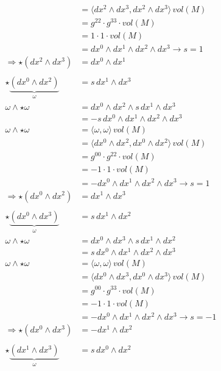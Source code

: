\begin{align*}
	\\
	&=
	\langle dx^2 \wedge dx^3, dx^2 \wedge dx^3 \rangle \, vol(M)
	\\
	&=
	g^{22} \cdot g^{33} \cdot vol(M)
	\\
	&=
	1 \cdot 1 \cdot vol(M)
	\\
	&=
	dx^0 \wedge dx^1 \wedge dx^2 \wedge dx^3 \rightarrow s = 1
	\\
	\Rightarrow \star(dx^2 \wedge dx^3)
	&=
	dx^0 \wedge dx^1
\\
\\
	\star \underbrace{(dx^0 \wedge dx^2)}_{\omega}
	&=
	s \, dx^1 \wedge dx^3
	\\
	\omega \wedge \star \omega
	&=
	dx^0 \wedge dx^2 \wedge s \, dx^1 \wedge dx^3
	\\
	&=
	-s \, dx^0 \wedge dx^1 \wedge dx^2 \wedge dx^3
	\\
	\omega \wedge \star \omega
	&=
	\langle \omega, \omega \rangle \, vol(M)
	\\
	&=
	\langle dx^0 \wedge dx^2, dx^0 \wedge dx^2 \rangle \, vol(M)
	\\
	&=
	g^{00} \cdot g^{22} \cdot vol(M)
	\\
	&=
	-1 \cdot 1 \cdot vol(M)
	\\
	&=
	-dx^0 \wedge dx^1 \wedge dx^2 \wedge dx^3 \rightarrow s = 1
	\\
	\Rightarrow \star(dx^0 \wedge dx^2)
	&=
	dx^1 \wedge dx^3
\\
\\
	\star \underbrace{(dx^0 \wedge dx^3)}_{\omega}
	&=
	s \, dx^1 \wedge dx^2
	\\
	\omega \wedge \star \omega
	&=
	dx^0 \wedge dx^3 \wedge s \, dx^1 \wedge dx^2
	\\
	&=
	s \, dx^0 \wedge dx^1 \wedge dx^2 \wedge dx^3
	\\
	\omega \wedge \star \omega
	&=
	\langle \omega, \omega \rangle \, vol(M)
	\\
	&=
	\langle dx^0 \wedge dx^3, dx^0 \wedge dx^3 \rangle \, vol(M)
	\\
	&=
	g^{00} \cdot g^{33} \cdot vol(M)
	\\
	&=
	-1 \cdot 1 \cdot vol(M)
	\\
	&=
	-dx^0 \wedge dx^1 \wedge dx^2 \wedge dx^3 \rightarrow s = -1
	\\
	\Rightarrow \star(dx^0 \wedge dx^3)
	&=
	-dx^1 \wedge dx^2
\\
\\
	\star \underbrace{(dx^1 \wedge dx^3)}_{\omega}
	&=
	s \, dx^0 \wedge dx^2
	\\

\end{align*}
